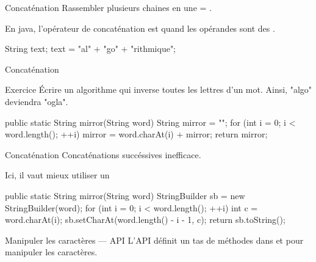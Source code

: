 \begin{frame}[fragile]{Concaténation}
  Rassembler plusieurs chaines en une = .

  En java, l'opérateur de concaténation est \pc{+} quand les opérandes
  sont des .

  \begin{java}
String text;
text = "al" + "go" + "rithmique";
  \end{java}
\end{frame}

\begin{frame}[fragile]{Concaténation}
  \begin{block}{Exercice}
    Écrire un algorithme qui inverse toutes les lettres d'un mot.
    Ainsi, "algo" deviendra "ogla".
  \end{block}

  \pause
  \begin{java}
public static String mirror(String word) {
    String mirror = "";
    for (int i = 0; i < word.length(); ++i) {
        mirror = word.charAt(i) + mirror;
    }
    return mirror;
}
  \end{java}
\end{frame}

\begin{frame}[fragile]{Concaténation}
  Concaténations succéssives inefficace.

  \pause
  Ici, il vaut mieux utiliser un 
  \begin{java}
public static String mirror(String word) {
    StringBuilder sb = new StringBuilder(word);
    for (int i = 0; i < word.length(); ++i) {
        int c = word.charAt(i);
        sb.setCharAt(word.length() - i - 1, c);
    }
    return sb.toString();
}
  \end{java}
\end{frame}

\begin{frame}{Manipuler les caractères --- API}
  L'API définit un tas de méthodes dans  et  pour
  manipuler les caractères.
  \begin{description}
    \item {}
    \item {}
    \item {}
    \item {}
    \item {}
    \item {}
  \end{description}
\end{frame}

